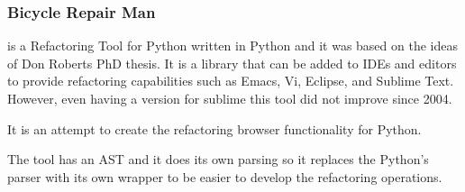 
\subsubsection{Bicycle Repair Man}

 is a Refactoring Tool for Python written in Python and it was based on the ideas of Don Roberts PhD thesis. It is a library that can be added to IDEs and editors to provide refactoring capabilities such as Emacs, Vi, Eclipse, and Sublime Text. However, even having a version for sublime this tool did not improve since 2004.

It is an attempt to create the refactoring browser functionality for Python. 

The tool has an AST and it does its own parsing so it replaces the Python's parser with its own wrapper to be easier to develop the refactoring operations.


